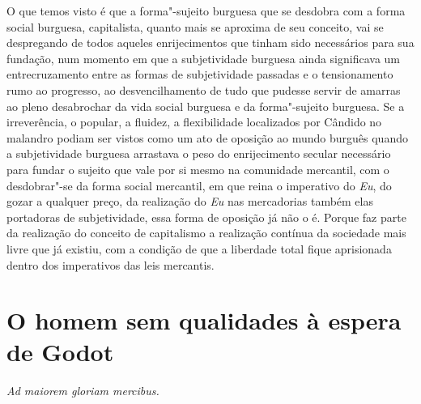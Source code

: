 O que temos visto é que a forma"-sujeito burguesa que se desdobra com a
forma social burguesa, capitalista, quanto mais se aproxima de seu
conceito, vai se despregando de todos aqueles enrijecimentos que tinham
sido necessários para sua fundação, num momento em que a subjetividade
burguesa ainda significava um entrecruzamento entre as formas de
subjetividade passadas e o tensionamento rumo ao progresso, ao
desvencilhamento de tudo que pudesse servir de amarras ao pleno
desabrochar da vida social burguesa e da forma"-sujeito burguesa. Se a
irreverência, o popular, a fluidez, a flexibilidade localizados por
Cândido no malandro podiam ser vistos como um ato de oposição ao mundo
burguês quando a subjetividade burguesa arrastava o peso do
enrijecimento secular necessário para fundar o sujeito que vale por si
mesmo na comunidade mercantil, com o desdobrar"-se da forma social
mercantil, em que reina o imperativo do \emph{Eu}, do gozar a qualquer
preço, da realização do \emph{Eu} nas mercadorias também elas portadoras
de subjetividade, essa forma de oposição já não o é. Porque faz parte da
realização do conceito de capitalismo a realização contínua da sociedade
mais livre que já existiu, com a condição de que a liberdade total fique
aprisionada dentro dos imperativos das leis mercantis.

\chapter*{O homem sem qualidades à espera de Godot}

\emph{Ad maiorem gloriam mercibus.}


